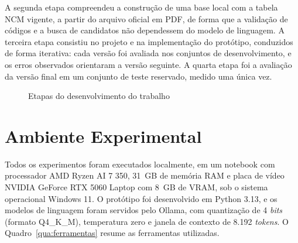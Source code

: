 A segunda etapa compreendeu a construção de uma base local com a tabela NCM vigente, a partir do arquivo oficial em PDF, de forma que a validação de códigos e a busca de candidatos não dependessem do modelo de linguagem. A terceira etapa consistiu no projeto e na implementação do protótipo, conduzidos de forma iterativa: cada versão foi avaliada nos conjuntos de desenvolvimento, e os erros observados orientaram a versão seguinte. A quarta etapa foi a avaliação da versão final em um conjunto de teste reservado, medido uma única vez.

\begin{figure}[H]
    \centering
    \caption{Etapas do desenvolvimento do trabalho}
    \label{fig:etapas-metodologia}
\end{figure}

\section{Ambiente Experimental}

Todos os experimentos foram executados localmente, em um notebook com processador AMD Ryzen AI 7 350, 31~GB de memória RAM e placa de vídeo NVIDIA GeForce RTX 5060 Laptop com 8~GB de VRAM, sob o sistema operacional Windows 11. O protótipo foi desenvolvido em Python 3.13, e os modelos de linguagem foram servidos pelo Ollama, com quantização de 4 \textit{bits} (formato Q4\_K\_M), temperatura zero e janela de contexto de 8.192 \textit{tokens}. O Quadro~\ref{qua:ferramentas} resume as ferramentas utilizadas.

